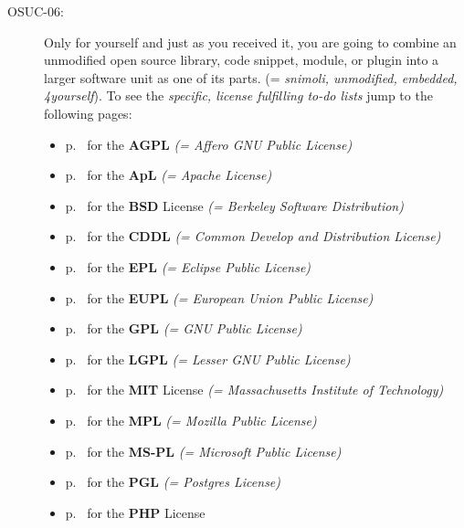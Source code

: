 \begin{description}
\item[OSUC-06:]\label{OSUC-06-DEF} Only for yourself and just as you received
it, you are going to combine an unmodified open source library, code snippet,
module, or plugin into a larger software unit as one of its parts. (=
\textit{snimoli, unmodified, embedded, 4yourself}).
To see the \textit{specific, license fulfilling to-do lists} jump to the
following pages:
   \begin{itemize}
    \item p.\ \pageref{OSUC-06-AGPL} for the \textbf{AGPL}
      \textit{(= Affero GNU Public License)} 
    \item p.\ \pageref{OSUC-06-Apache20} for the \textbf{ApL}
      \textit{(= Apache License)}
    \item p.\ \pageref{OSUC-06-BSD} for the \textbf{BSD} License
      \textit{(= Berkeley Software Distribution)}
    \item p.\ \pageref{OSUC-06-CDDL} for the \textbf{CDDL}
      \textit{(= Common Develop and Distribution License)}  
    \item p.\ \pageref{OSUC-06-EPL} for the \textbf{EPL}
      \textit{(= Eclipse Public License)}     
    \item p.\ \pageref{OSUC-06-EUPL} for the \textbf{EUPL}
      \textit{(= European Union Public License)} 
    \item p.\ \pageref{OSUC-06-GPL} for the \textbf{GPL}
       \textit{(= GNU Public License)} 
    \item p.\ \pageref{OSUC-06-LGPL} for the \textbf{LGPL}
      \textit{(= Lesser GNU Public License)}           
    \item p.\ \pageref{OSUC-06-MIT} for the \textbf{MIT} License
       \textit{(= Massachusetts Institute of Technology)} 
    \item p.\ \pageref{OSUC-06-MPL} for the \textbf{MPL}
      \textit{(= Mozilla Public License)}     
    \item p.\ \pageref{OSUC-06-MS-PL} for the \textbf{MS-PL}
      \textit{(= Microsoft Public License)} 
    \item p.\ \pageref{OSUC-06-PGL} for the \textbf{PGL}
      \textit{(= Postgres License)} 
    \item p.\ \pageref{OSUC-06-PHP} for the \textbf{PHP} License 
  \end{itemize}


\end{description}
